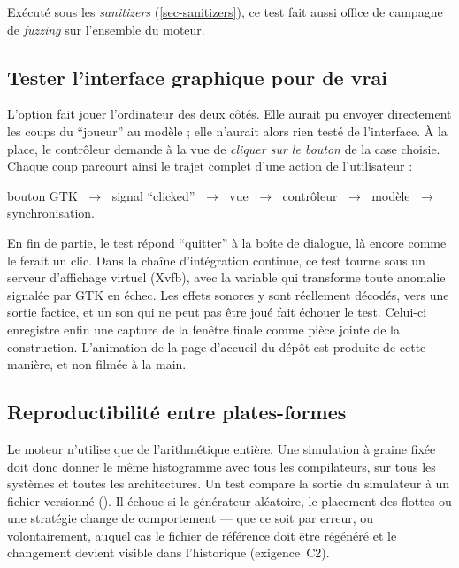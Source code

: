 Exécuté sous les \emph{sanitizers} (\cref{sec-sanitizers}), ce test fait aussi office de
campagne de \emph{fuzzing} sur l'ensemble du moteur.

\subsection{Tester l'interface graphique pour de vrai}

L'option  fait jouer l'ordinateur des deux côtés. Elle aurait pu envoyer
directement les coups du \enquote{joueur} au modèle ; elle n'aurait alors rien testé de
l'interface. À la place, le contrôleur demande à la vue de \emph{cliquer sur le bouton} de
la case choisie. Chaque coup parcourt ainsi le trajet complet d'une action de
l'utilisateur :

\begin{center}
    bouton GTK $\;\rightarrow\;$ signal \enquote{clicked} $\;\rightarrow\;$ vue
    $\;\rightarrow\;$ contrôleur $\;\rightarrow\;$ modèle $\;\rightarrow\;$ synchronisation.
\end{center}

En fin de partie, le test répond \enquote{quitter} à la boîte de dialogue, là encore comme
le ferait un clic. Dans la chaîne d'intégration continue, ce test tourne sous un serveur
d'affichage virtuel (Xvfb), avec la variable  qui transforme
toute anomalie signalée par GTK en échec. Les effets sonores y sont réellement décodés, vers
une sortie factice, et un son qui ne peut pas être joué fait échouer le test. Celui-ci
enregistre enfin une capture de la fenêtre finale comme pièce jointe de la construction. L'animation de la page d'accueil du dépôt est
produite de cette manière, et non filmée à la main.

\subsection{Reproductibilité entre plates-formes}

Le moteur n'utilise que de l'arithmétique entière. Une simulation à graine fixée doit donc
donner le même histogramme avec tous les compilateurs, sur tous les systèmes et toutes les
architectures. Un test compare la sortie du simulateur à un fichier versionné
(). Il échoue si le générateur aléatoire, le
placement des flottes ou une stratégie change de comportement --- que ce soit par erreur, ou
volontairement, auquel cas le fichier de référence doit être régénéré et le changement
devient visible dans l'historique (exigence~C2).

